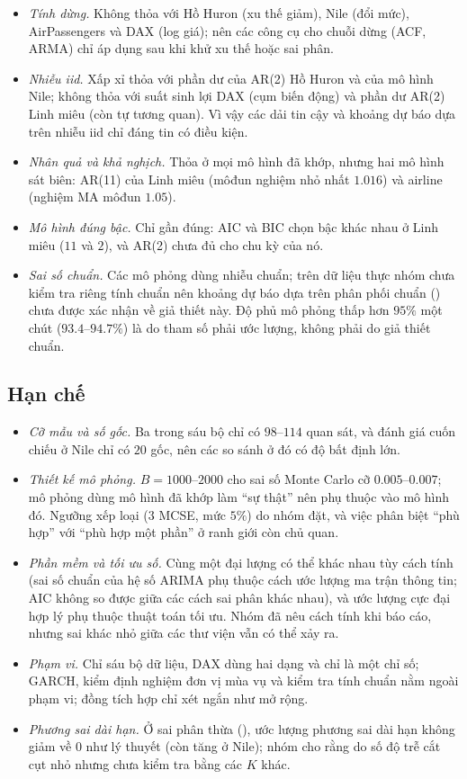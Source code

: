 \begin{itemize}[leftmargin=*,itemsep=2pt]
\item \emph{Tính dừng.} Không thỏa với Hồ Huron (xu thế giảm), Nile (đổi mức), AirPassengers và DAX (log giá); nên các công cụ cho chuỗi dừng (ACF, ARMA) chỉ áp dụng sau khi khử xu thế hoặc sai phân.
\item \emph{Nhiễu iid.} Xấp xỉ thỏa với phần dư của AR(2) Hồ Huron và của mô hình Nile; không thỏa với suất sinh lợi DAX (cụm biến động) và phần dư AR(2) Linh miêu (còn tự tương quan). Vì vậy các dải tin cậy và khoảng dự báo dựa trên nhiễu iid chỉ đáng tin có điều kiện.
\item \emph{Nhân quả và khả nghịch.} Thỏa ở mọi mô hình đã khớp, nhưng hai mô hình sát biên: AR(11) của Linh miêu (môđun nghiệm nhỏ nhất $1.016$) và airline (nghiệm MA môđun $1.05$).
\item \emph{Mô hình đúng bậc.} Chỉ gần đúng: AIC và BIC chọn bậc khác nhau ở Linh miêu ($11$ và $2$), và AR(2) chưa đủ cho chu kỳ của nó.
\item \emph{Sai số chuẩn.} Các mô phỏng dùng nhiễu chuẩn; trên dữ liệu thực nhóm chưa kiểm tra riêng tính chuẩn nên khoảng dự báo dựa trên phân phối chuẩn () chưa được xác nhận về giả thiết này. Độ phủ mô phỏng thấp hơn $95\%$ một chút ($93.4$--$94.7\%$) là do tham số phải ước lượng, không phải do giả thiết chuẩn.
\end{itemize}

\subsection{Hạn chế}

\begin{itemize}[leftmargin=*,itemsep=2pt]
\item \emph{Cỡ mẫu và số gốc.} Ba trong sáu bộ chỉ có $98$--$114$ quan sát, và đánh giá cuốn chiếu ở Nile chỉ có $20$ gốc, nên các so sánh ở đó có độ bất định lớn.
\item \emph{Thiết kế mô phỏng.} $B=1000$--$2000$ cho sai số Monte Carlo cỡ $0.005$--$0.007$; mô phỏng dùng mô hình đã khớp làm ``sự thật'' nên phụ thuộc vào mô hình đó. Ngưỡng xếp loại ($3$ MCSE, mức $5\%$) do nhóm đặt, và việc phân biệt ``phù hợp'' với ``phù hợp một phần'' ở ranh giới còn chủ quan.
\item \emph{Phần mềm và tối ưu số.} Cùng một đại lượng có thể khác nhau tùy cách tính (sai số chuẩn của hệ số ARIMA phụ thuộc cách ước lượng ma trận thông tin; AIC không so được giữa các cách sai phân khác nhau), và ước lượng cực đại hợp lý phụ thuộc thuật toán tối ưu. Nhóm đã nêu cách tính khi báo cáo, nhưng sai khác nhỏ giữa các thư viện vẫn có thể xảy ra.
\item \emph{Phạm vi.} Chỉ sáu bộ dữ liệu, DAX dùng hai dạng và chỉ là một chỉ số; GARCH, kiểm định nghiệm đơn vị mùa vụ và kiểm tra tính chuẩn nằm ngoài phạm vi; đồng tích hợp chỉ xét ngắn như mở rộng.
\item \emph{Phương sai dài hạn.} Ở sai phân thừa (), ước lượng phương sai dài hạn không giảm về $0$ như lý thuyết (còn tăng ở Nile); nhóm cho rằng do số độ trễ cắt cụt nhỏ nhưng chưa kiểm tra bằng các $K$ khác.
\end{itemize}
